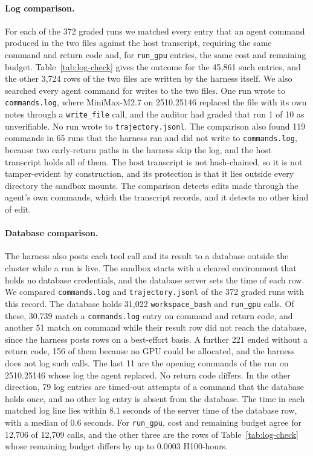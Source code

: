 \paragraph{Log comparison.} For each of the 372 graded runs we matched every
entry that an agent command produced in the two files against the host
transcript, requiring the same command and return code and, for
\texttt{run\_gpu} entries, the same cost and remaining budget.
Table~\ref{tab:log-check} gives the outcome for the 45,861 such entries, and
the other 3,724 rows of the two files are written by the harness itself. We
also searched every agent command for writes to the two files. One run wrote
to \texttt{commands.log}, where MiniMax-M2.7 on 2510.25146 replaced the file
with its own notes through a \texttt{write\_file} call, and the auditor had
graded that run 1 of 10 as unverifiable. No run wrote to
\texttt{trajectory.jsonl}. The comparison also found 119 commands in 65 runs
that the harness ran and did not write to \texttt{commands.log}, because two
early-return paths in the harness skip the log, and the host transcript holds
all of them. The host transcript is not hash-chained, so it is not
tamper-evident by construction, and its protection is that it lies outside
every directory the sandbox mounts. The comparison detects edits made through
the agent's own commands, which the transcript records, and it detects no
other kind of edit.

\paragraph{Database comparison.} The harness also posts each tool call and
its result to a database outside the cluster while a run is live. The sandbox
starts with a cleared environment that holds no database credentials, and the
database server sets the time of each row. We compared \texttt{commands.log}
and \texttt{trajectory.jsonl} of the 372 graded runs with this record. The
database holds 31,022 \texttt{workspace\_bash} and \texttt{run\_gpu} calls. Of
these, 30,739 match a \texttt{commands.log} entry on command and return code,
and another 51 match on command while their result row did not reach the
database, since the harness posts rows on a best-effort basis. A further 221
ended without a return code, 156 of them because no GPU could be allocated,
and the harness does not log such calls. The last 11 are the opening commands
of the run on 2510.25146 whose log the agent replaced. No return code differs.
In the other direction, 79 log entries are timed-out attempts of a command
that the database holds once, and no other log entry is absent from the
database. The time in each matched log line lies within 8.1 seconds of the
server time of the database row, with a median of 0.6 seconds. For
\texttt{run\_gpu}, cost and remaining budget agree for 12,706 of 12,709 calls,
and the other three are the rows of Table~\ref{tab:log-check} whose remaining
budget differs by up to 0.0003 H100-hours.

